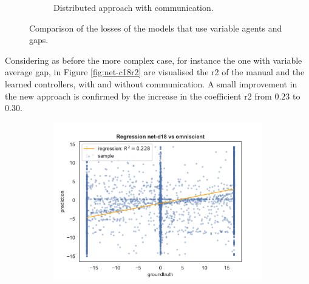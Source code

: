 \begin{figure}[!htb]
\begin{center}
\begin{subfigure}[h]{0.49\textwidth}
			\caption{Distributed approach with communication.}
		\end{subfigure}	
	\end{center}
	\vspace{-0.5cm}
	\caption[Comparison of the losses of the models that use viariable 
	agents.]{Comparison of the losses of the models that use variable agents 
	and gaps.}
	\label{fig:commlossNvar}
\end{figure}

Considering as before the more complex case, for instance the one with variable 
average gap, in Figure \ref{fig:net-c18r2} are visualised the \gls{r2} of 
the manual and the learned controllers, with and without communication.
A small improvement in the new approach is confirmed by the increase in the 
coefficient \gls{r2} from $0.23$ to $0.30$. 
\begin{figure}[!htb]
	\begin{center}
		\begin{subfigure}[h]{0.49\textwidth}
			\includegraphics[width=\textwidth]{contents/images/net-d18/regression-net-d18-vs-omniscient}%
		\end{subfigure}
		\hfill\vspace{-0.5cm}
		\begin{subfigure}[h]{0.49\textwidth}

\end{subfigure}
\end{center}
\end{figure}
